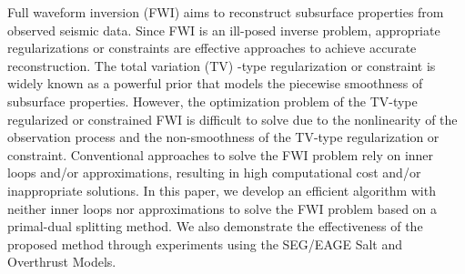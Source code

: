 \begin{summary}
Full waveform inversion (FWI) aims to reconstruct subsurface properties from observed seismic data.
Since FWI is an ill-posed inverse problem, appropriate regularizations or constraints are effective approaches to achieve accurate reconstruction.
The total variation (TV) -type regularization or constraint is widely known as a powerful prior that models the piecewise smoothness of subsurface properties.
However, the optimization problem of the TV-type regularized or constrained FWI is difficult to solve due to the nonlinearity of the observation process and the non-smoothness of the TV-type regularization or constraint.
Conventional approaches to solve the FWI problem rely on inner loops and/or approximations, resulting in high computational cost and/or inappropriate solutions.
In this paper, we develop an efficient algorithm with neither inner loops nor approximations to solve the FWI problem based on a primal-dual splitting method.
We also demonstrate the effectiveness of the proposed method through experiments using the SEG/EAGE Salt and Overthrust Models.
\end{summary}
